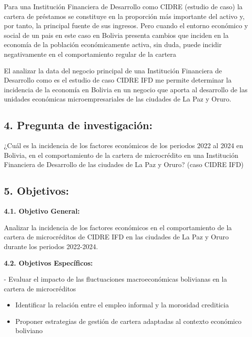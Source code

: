 \documentclass[Royal,times,sageh]{sagej}
\begin{document}
Para una Institución Financiera de Desarrollo como CIDRE (estudio de
caso) la cartera de préstamos se constituye en la proporción más
importante del activo y, por tanto, la principal fuente de sus ingresos.
Pero cuando el entorno económico y social de un pais en este caso en
Bolivia presenta cambios que inciden en la economía de la población
económicamente activa, sin duda, puede incidir negativamente en el
comportamiento regular de la cartera

El analizar la data del negocio principal de una Institución Financiera
de Desarrollo como es el estudio de caso CIDRE IFD me permite determinar
la incidencia de la economía en Bolivia en un negocio que aporta al
desarrollo de las unidades económicas microempresariales de las ciudades
de La Paz y Oruro.

\subsection{\texorpdfstring{4. \textbf{Pregunta de
investigación:}}{4. Pregunta de investigación:}}\label{pregunta-de-investigaciuxf3n}

¿Cuál es la incidencia de los factores económicos de los periodos 2022
al 2024 en Bolivia, en el comportamiento de la cartera de microcrédito
en una Institución Financiera de Desarrollo de las ciudades de La Paz y
Oruro? (caso CIDRE IFD)

\subsection{\texorpdfstring{5.
\textbf{Objetivos:}}{5. Objetivos:}}\label{objetivos}

\textbf{4.1. Objetivo General:}

Analizar la incidencia de los factores económicos en el comportamiento
de la cartera de microcréditos de CIDRE IFD en las ciudades de La Paz y
Oruro durante los periodos 2022-2024.

\textbf{4.2. Objetivos Específicos:}

- Evaluar el impacto de las fluctuaciones macroeconómicas bolivianas en
la cartera de microcréditos

\begin{itemize}
\item
  Identificar la relación entre el empleo informal y la morosidad
  crediticia
\item
  Proponer estrategias de gestión de cartera adaptadas al contexto
  económico boliviano
\end{itemize}
\end{document}
